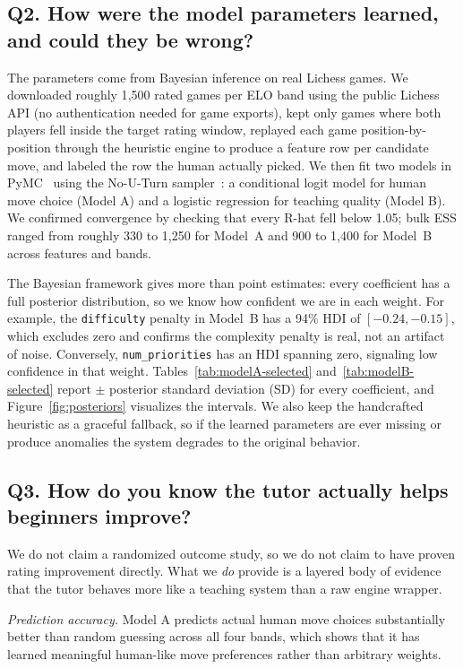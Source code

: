 \documentclass[11pt]{article}
\begin{document}
\subsection*{Q2. How were the model parameters learned, and could they be wrong?}
The parameters come from Bayesian inference on real Lichess games. We downloaded roughly 1{,}500 rated games per ELO band using the public Lichess API (no authentication needed for game exports), kept only games where both players fell inside the target rating window, replayed each game position-by-position through the heuristic engine to produce a feature row per candidate move, and labeled the row the human actually picked. We then fit two models in PyMC~\cite{salvatier2016pymc} using the No-U-Turn sampler~\cite{hoffman2014nuts}: a conditional logit model for human move choice (Model A) and a logistic regression for teaching quality (Model B). We confirmed convergence by checking that every R-hat fell below 1.05; bulk ESS ranged from roughly 330 to 1{,}250 for Model~A and 900 to 1{,}400 for Model~B across features and bands.

The Bayesian framework gives more than point estimates: every coefficient has a full posterior distribution, so we know how confident we are in each weight. For example, the \texttt{difficulty} penalty in Model~B has a 94\% HDI of $[-0.24, -0.15]$, which excludes zero and confirms the complexity penalty is real, not an artifact of noise. Conversely, \texttt{num\_priorities} has an HDI spanning zero, signaling low confidence in that weight. Tables~\ref{tab:modelA-selected} and~\ref{tab:modelB-selected} report $\pm$ posterior standard deviation (SD) for every coefficient, and Figure~\ref{fig:posteriors} visualizes the intervals. We also keep the handcrafted heuristic as a graceful fallback, so if the learned parameters are ever missing or produce anomalies the system degrades to the original behavior.

\subsection*{Q3. How do you know the tutor actually helps beginners improve?}
We do not claim a randomized outcome study, so we do not claim to have proven rating improvement directly. What we \emph{do} provide is a layered body of evidence that the tutor behaves more like a teaching system than a raw engine wrapper.

\emph{Prediction accuracy.} Model A predicts actual human move choices substantially better than random guessing across all four bands, which shows that it has learned meaningful human-like move preferences rather than arbitrary weights.
\end{document}
